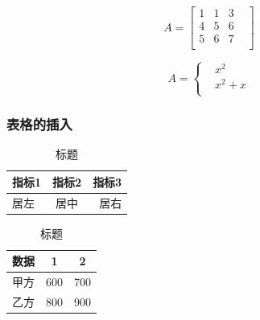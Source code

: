 \documentclass[UTF8]{ctexart}
\begin{document}
\begin{equation}
	A=\begin{bmatrix}
		1 & 1 & 3 \\4&5&6\\5&6&7&\\
	\end{bmatrix}
\end{equation}

\begin{equation}
	A=\begin{cases}
		 & x^2 \\&x^2+x\\
	\end{cases}
\end{equation}

\subsubsection{表格的插入}

\begin{table}[!htbp]
	\centering
	\caption{标题}
	\begin{tabular}{|l|c|r|}

		\hline
		指标1 & 指标2 & 指标3 \\
		\hline
		居左  & 居中  & 居右  \\
		\hline
	\end{tabular}
\end{table}


\begin{table}[!htbp]
	\centering
	\caption{标题}
	\begin{tabular}{ccc}
		\toprule
		数据 & 1   & 2   \\
		\midrule
		甲方 & 600 & 700 \\
		乙方 & 800 & 900 \\
		\bottomrule
	\end{tabular}
\end{table}
\end{document}
